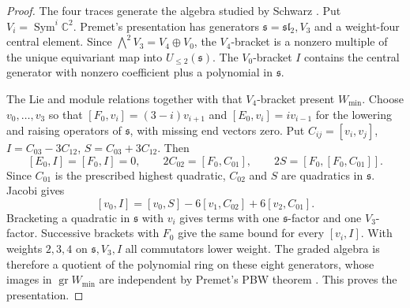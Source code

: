 \documentclass[11pt,a4paper]{article}
\renewcommand{\le}{\leqslant}\renewcommand{\ge}{\geqslant}
\newcommand{\C}{\mathbb C}
\theoremstyle{definition}
\begin{document}
\begin{proof}
The four traces generate the algebra studied by Schwarz \cite{Schwarz}. Put \(V_i=\operatorname{Sym}^i\C^2\).
Premet's presentation \cite[Proposition~4.1, Theorem~6.1 and Remark~6.5]{PremetW} has generators \(\mathfrak s=\mathfrak{sl}_2,V_3\) and a weight-four central element. Since \(\bigwedge^2 V_3=V_4\oplus V_0\), the \(V_4\)-bracket is a nonzero multiple of the unique equivariant map into \(U_{\le2}(\mathfrak s)\). The \(V_0\)-bracket \(I\) contains the central generator with nonzero coefficient plus a polynomial in \(\mathfrak s\).

The Lie and module relations together with that \(V_4\)-bracket present \(W_{\min}\).
Choose \(v_0,\ldots,v_3\) so that \([F_0,v_i]=(3-i)v_{i+1}\) and \([E_0,v_i]=iv_{i-1}\) for the lowering and raising operators of \(\mathfrak s\), with missing end vectors zero. Put \(C_{ij}=[v_i,v_j]\), \(I=C_{03}-3C_{12}\), \(S=C_{03}+3C_{12}\). Then
\[
 [E_0,I]=[F_0,I]=0,\qquad
 2C_{02}=[F_0,C_{01}],\qquad 2S=[F_0,[F_0,C_{01}]] .
\]
Since \(C_{01}\) is the prescribed highest quadratic, \(C_{02}\) and \(S\) are quadratics in \(\mathfrak s\). Jacobi gives
\[
 [v_0,I]=[v_0,S]-6[v_1,C_{02}]+6[v_2,C_{01}] .
\]
Bracketing a quadratic in \(\mathfrak s\) with \(v_i\) gives terms with one \(\mathfrak s\)-factor and one \(V_3\)-factor. Successive brackets with \(F_0\) give the same bound for every \([v_i,I]\). With weights \(2,3,4\) on \(\mathfrak s,V_3,I\) all commutators lower weight. The graded algebra is therefore a quotient of the polynomial ring on these eight generators, whose images in \(\operatorname{gr}W_{\min}\) are independent by Premet's PBW theorem \cite[Thm.~4.6]{PremetPBW}. This proves the presentation.


\end{proof}
\end{document}
